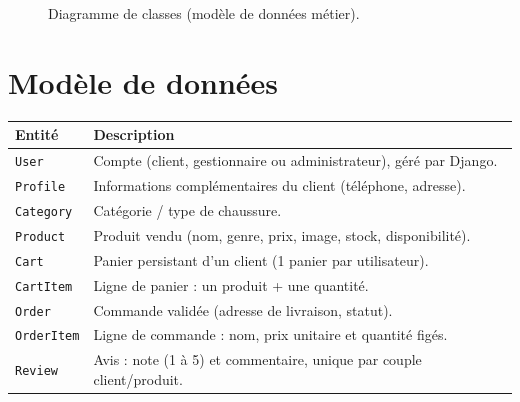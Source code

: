 \documentclass[11pt,a4paper]{report}
\begin{document}
\begin{figure}[ht]
{}
\caption{Diagramme de classes (modèle de données métier).}
\label{fig:class}
\end{figure}

\section{Modèle de données}
\begin{center}
\renewcommand{\arraystretch}{1.25}
\begin{tabularx}{\linewidth}{@{}lX@{}}
\toprule
\textbf{Entité} & \textbf{Description} \\
\midrule
\texttt{User} & Compte (client, gestionnaire ou administrateur), géré par Django. \\
\texttt{Profile} & Informations complémentaires du client (téléphone, adresse). \\
\texttt{Category} & Catégorie / type de chaussure. \\
\texttt{Product} & Produit vendu (nom, genre, prix, image, stock, disponibilité). \\
\texttt{Cart} & Panier persistant d'un client (1 panier par utilisateur). \\
\texttt{CartItem} & Ligne de panier : un produit + une quantité. \\
\texttt{Order} & Commande validée (adresse de livraison, statut). \\
\texttt{OrderItem} & Ligne de commande : nom, prix unitaire et quantité figés. \\
\texttt{Review} & Avis : note (1 à 5) et commentaire, unique par couple client/produit. \\
\bottomrule
\end{tabularx}
\end{center}
\end{document}
